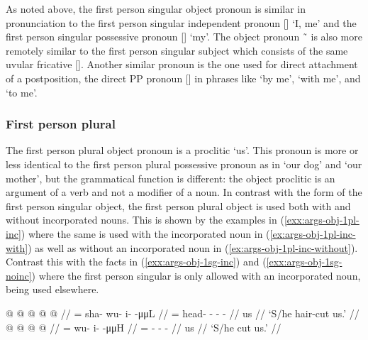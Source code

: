 As noted above, the first person singular object pronoun is similar in pronunciation to the first person singular independent pronoun  [] ‘I, me’ and the first person singular possessive pronoun  [] ‘my’.
The object pronoun  \~\  is also more remotely similar to the first person singular subject  which consists of the same uvular fricative [].
Another similar pronoun is the one used for direct attachment of a postposition, the direct PP pronoun  [] in phrases like  ‘by me’,  ‘with me’, and  ‘to me’.


\subsubsection{First person plural}\label{sec:args-obj-1pl}

The first person plural object pronoun is a proclitic  ‘us’.
This pronoun is more or less identical to the first person plural possessive pronoun as in  ‘our dog’ and  ‘our mother’, but the grammatical function is different: the object proclitic  is an argument of a verb and not a modifier of a noun.
In contrast with the  form of the first person singular object, the first person plural object  is used both with and without incorporated nouns.
This is shown by the examples in (\ref{exx:args-obj-1pl-inc}) where the same  is used with the incorporated noun  in (\ref{ex:args-obj-1pl-inc-with}) as well as without an incorporated noun in (\ref{ex:args-obj-1pl-inc-without}).
Contrast this with the facts in (\ref{exx:args-obj-1sg-inc}) and (\ref{exx:args-obj-1sg-noinc}) where the first person singular  is only allowed with an incorporated noun,  being used elsewhere.

\pex\label{exx:args-obj-1pl-inc}%
\a\label{ex:args-obj-1pl-inc-with}%
%
\begingl
	\gla	{} @  @ {} @ {} @ {} @ {} //
	\glb	{}= sha- wu- i-  -μμL //
	\glc	{}= head- - -  - //
	\gld	us  {} {} {} {} //
	\glft	‘S/he hair-cut us.’
		//
\endgl
\a\label{ex:args-obj-1pl-inc-without}%
%
\begingl
	\gla	{} @  @ {} @ {} @ {} //
	\glb	{}= wu- i-  -μμH //
	\glc	{}= - -  - //
	\gld	us  //
	\glft	‘S/he cut us.’
		//
\endgl
\xe

